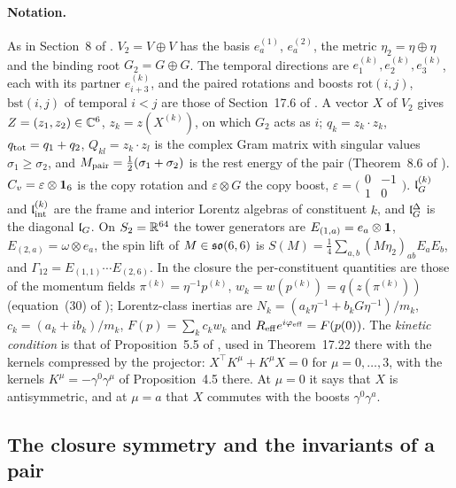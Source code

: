 \paragraph{Notation.} As in Section~8 of \cite{RE}. $V_2=V\oplus V$ has the basis $e^{(1)}_a$, $e^{(2)}_a$, the metric $\eta_2=\eta\oplus\eta$ and
the binding root $G_2=G\oplus G$. The temporal directions are $e^{(k)}_1,e^{(k)}_2,e^{(k)}_3$, each with its partner $e^{(k)}_{i+3}$, and the
paired rotations and boosts $\mathrm{rot}(i,j)$, $\mathrm{bst}(i,j)$ of temporal $i<j$ are those of Section~17.6 of \cite{ES17}. A vector $X$ of
$V_2$ gives $Z=(z_1,z_2)\in\mathbb{C}^6$, $z_k=z(X^{(k)})$, on which $G_2$ acts as $i$; $q_k=z_k\cdot z_k$, $q_{\rm tot}=q_1+q_2$, $Q_{kl}=z_k\cdot z_l$ is the
complex Gram matrix with singular values $\sigma_1\ge\sigma_2$, and $M_{\rm pair}=\tfrac12(\sigma_1+\sigma_2)$ is the rest energy of the pair
(Theorem~8.6 of \cite{RE}). $C_v=\varepsilon\otimes\mathbf 1_6$ is the copy rotation and $\varepsilon\otimes G$ the copy boost,
$\varepsilon=\bigl(\begin{smallmatrix}0&-1\\1&0\end{smallmatrix}\bigr)$. $\mathfrak l_G^{(k)}$ and $\mathfrak l_{\rm int}^{(k)}$ are the frame and interior Lorentz
algebras of constituent $k$, and $\mathfrak l_G^\Delta$ is the diagonal $\mathfrak l_G$. On $S_2=\mathbb{R}^{64}$ the tower generators are $E_{(1,a)}=e_a\otimes\mathbf 1$,
$E_{(2,a)}=\omega\otimes e_a$, the spin lift of $M\in\mathfrak{so}(6,6)$ is $S(M)=\tfrac14\sum_{a,b}(M\eta_2)_{ab}E_aE_b$, and $\Gamma_{12}=E_{(1,1)}\cdots E_{(2,6)}$.
In the closure the per-constituent quantities are those of the momentum fields $\pi^{(k)}=\eta^{-1}p^{(k)}$, $w_k=w(p^{(k)})=q(z(\pi^{(k)}))$
(equation~(30) of \cite{ES17}); Lorentz-class inertias are $N_k=(a_k\eta^{-1}+b_kG\eta^{-1})/m_k$, $c_k=(a_k+ib_k)/m_k$, $F(p)=\sum_kc_kw_k$ and
$R_{\rm eff}e^{i\varphi_{\rm eff}}=F(p(0))$. The \emph{kinetic condition} is that of Proposition~5.5 of \cite{ES17}, used in Theorem~17.22 there
with the kernels compressed by the projector: $X^{\!\top}K^\mu+K^\mu X=0$ for $\mu=0,\dots,3$, with the kernels $K^\mu=-\gamma^0\gamma^\mu$ of
Proposition~4.5 there. At $\mu=0$ it says that $X$ is antisymmetric, and at $\mu=a$ that $X$ commutes with the boosts $\gamma^0\gamma^a$.

\subsection{The closure symmetry and the invariants of a pair}
\label{e5:sec:symmetry}

